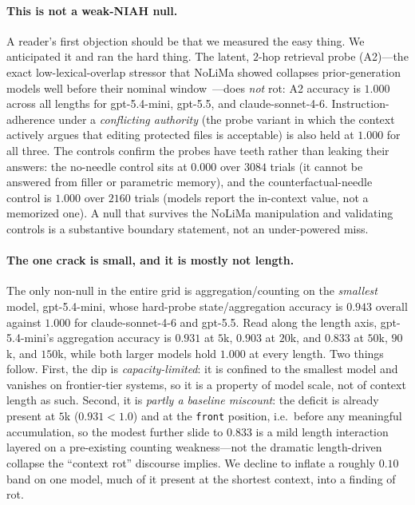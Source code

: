 \documentclass[11pt]{article}
\begin{document}
\paragraph{This is not a weak-NIAH null.}
A reader's first objection should be that we measured the easy thing. We anticipated
it and ran the hard thing. The latent, $2$-hop retrieval probe (A2)---the exact
low-lexical-overlap stressor that NoLiMa showed collapses prior-generation models
well before their nominal window~\cite{modarressi2025nolima}---does \emph{not} rot:
A2 accuracy is $1.000$ across all lengths for gpt-5.4-mini, gpt-5.5, and
claude-sonnet-4-6. Instruction-adherence under a \emph{conflicting authority} (the
probe variant in which the context actively argues that editing protected files is
acceptable) is also held at $1.000$ for all three. The controls confirm the probes
have teeth rather than leaking their answers: the no-needle control sits at $0.000$
over $3084$ trials (it cannot be answered from filler or parametric memory), and the
counterfactual-needle control is $1.000$ over $2160$ trials (models report the
in-context value, not a memorized one). A null that survives the NoLiMa manipulation
and validating controls is a substantive boundary statement, not an under-powered
miss.

\paragraph{The one crack is small, and it is mostly not length.}
The only non-null in the entire grid is aggregation/counting on the \emph{smallest}
model, gpt-5.4-mini, whose hard-probe state/aggregation accuracy is $0.943$ overall
against $1.000$ for claude-sonnet-4-6 and gpt-5.5. Read along the length axis,
gpt-5.4-mini's aggregation accuracy is $0.931$ at $5$k, $0.903$ at $20$k, and
$0.833$ at $50$k, $90$k, and $150$k, while both larger models hold $1.000$ at every
length. Two things follow. First, the dip is \emph{capacity-limited}: it is confined
to the smallest model and vanishes on frontier-tier systems, so it is a property of
model scale, not of context length as such. Second, it is \emph{partly a baseline
miscount}: the deficit is already present at $5$k ($0.931<1.0$) and at the
\texttt{front} position, i.e.\ before any meaningful accumulation, so the modest
further slide to $0.833$ is a mild length interaction layered on a pre-existing
counting weakness---not the dramatic length-driven collapse the ``context rot''
discourse implies. We decline to inflate a roughly $0.10$ band on one model, much of
it present at the shortest context, into a finding of rot.
\end{document}

